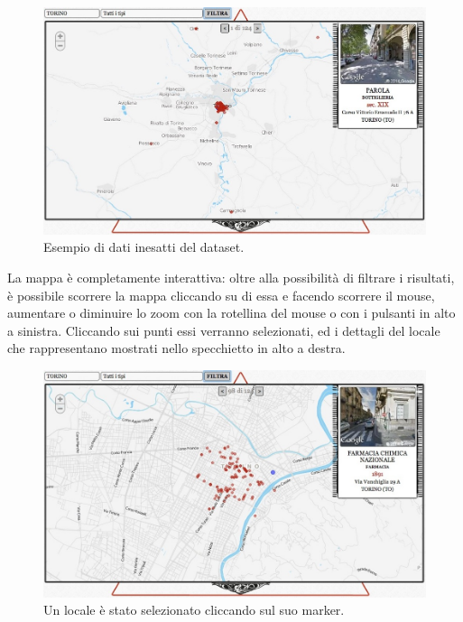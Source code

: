 \begin{figure}[ht!]
	\centering
		\includegraphics[width=\textwidth]{img/s11.jpg}
	\caption{Esempio di dati inesatti del dataset.}
	\label{fig:err}
\end{figure}

La mappa è completamente interattiva: oltre alla possibilità di filtrare i risultati, è possibile scorrere la mappa cliccando su di essa e facendo scorrere il mouse, aumentare o diminuire lo zoom con la rotellina del mouse o con i pulsanti in alto a sinistra. Cliccando sui punti essi verranno selezionati, ed i dettagli del locale che rappresentano mostrati nello specchietto in alto a destra.

\begin{figure}[ht!]
	\centering
		\includegraphics[width=\textwidth]{img/s13.jpg}
	\caption{Un locale è stato selezionato cliccando sul suo marker.}
\end{figure}